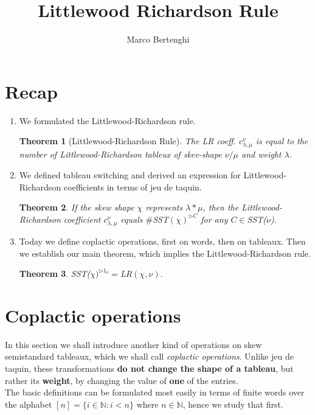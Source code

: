 \documentclass{article}
\title{Littlewood Richardson Rule}
\author{Marco Bertenghi}
\date{}
\newtheorem{thm}{Theorem}
\begin{document}
\maketitle
\section{Recap}
\begin{enumerate}
    \item We formulated the Littlewood-Richardson rule.
    \begin{thm}[Littlewood-Richardson Rule] The LR coeff. $c_{\lambda, \mu}^\nu$ is equal to the number of Littlewood-Richardson tableux of skev-shape $\nu/\mu$ and weight $\lambda$.
    \end{thm}
    \item We defined tableau switching and derived an expression for Littlewood-Richardson coefficients in terms of jeu de taquin.
    \begin{thm} If the skew shape $\chi$ represents $\lambda* \mu$, then the Littlewood-Richardson coefficient $c_{ \lambda, \mu}^\nu$ equals $\#$SST$( \chi)^{\triangleright C}$ for any $C \in $SST($\nu$).  
    \end{thm}
    \item Today we define coplactic operations, first on words, then on tableaux. Then we establish our main theorem, which implies the Littlewood-Richardson rule. 
    \begin{thm} SST($\chi)^{ \triangleright 1_\nu} = $LR$( \chi, \nu)$. 
    \end{thm}
\end{enumerate}
\section{Coplactic operations}
In this section we shall introduce another kind of operations on skew semistandard
tableaux, which we shall call \textit{coplactic operations}. Unlike jeu de taquin, these
transformations \textbf{do not change the shape of a tableau}, but rather its \textbf{weight}, by
changing the value of \textbf{one} of the entries.
\\
The basic definitions can be formulated
most easily in terms of finite words over the alphabet $[n]= \{i \in \mathbb{N}: i < n\}$ where $n \in \mathbb{N}$,  hence we study that first. 
\end{document}

